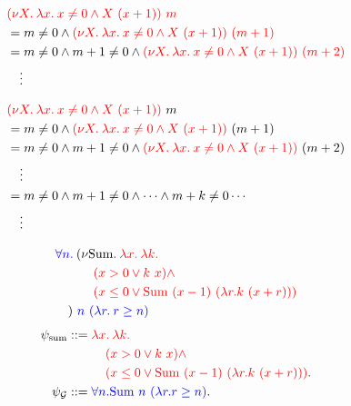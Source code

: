 \documentclass{jarticle}
\theoremstyle{definition}
\newcommand \goal {\psi}
\newcommand {\pdrtop} {\psi_{\mathcal{G}}}
\begin{document}
\begin{align*}
&{ \color{red} (\nu X.\: \lambda x.\: x \neq 0 \wedge X\ (x + 1)) \ m} \\
  &= m \neq 0 \wedge { \color{red} (\nu X.\: \lambda x.\: x \neq 0 \wedge X\
          (x + 1))\ (m + 1)}
    \\
  &= m \neq 0 \wedge m +1 \neq 0 \wedge {\color{red}(\nu X.\: \lambda x.\: x \neq 0 \wedge
          X\ (x + 1))\ (m + 2)} \\
  &\quad \vdots \\
\end{align*}

\begin{align*}
    &{\color{red} (\nu X.\: \lambda x.\: x \neq 0 \wedge X\ (x + 1))}\ m \\
    &= m \neq 0 \wedge {\color{red} (\nu X.\: \lambda x.\: x \neq 0 \wedge X\ (x
    + 1))}\ (m + 1)
    \\
    &= m \neq 0 \wedge m +1 \neq 0 \wedge {\color{red} (\nu X.\: \lambda x.\: x
    \neq 0 \wedge
          X\ (x + 1))}\ (m + 2) \\
  &\quad \vdots \\
  &= m \neq 0 \wedge m +1 \neq 0 \wedge \dots \wedge m + k \neq 0 \cdots \\
  &\quad \vdots \\
\end{align*}

\begin{align*}
    &{\color{blue}\forall n.\:} (\nu \text{Sum}.\: {\color{red} \lambda x.\:
    \lambda k.\: } \\
                     &\quad\quad\quad {\color{red}(x > 0 \lor k\ x) \land} \\
                     &\quad\quad\quad  {\color{red}(x \leq 0 \lor \text{Sum}\ (x - 1)\ (\lambda
                     r. k\ (x + r)))}\\
    &\quad )\ {\color{blue}n\ (\lambda r.\: r \geq n)}
\end{align*}
\begin{align*}
    \goal_{\text{sum}} &::= {\color{red}\lambda x.\: \lambda k.\:} \\
    &\quad\quad\quad{\color{red}(x > 0 \lor k\ x) \land} \\
                     &\quad\quad\quad  {\color{red} (x \leq 0 \lor \text{Sum}\ (x - 1)\ (\lambda
                     r. k\ (x + r)))}.\\
    \pdrtop &::= {\color{blue}\forall n. \text{Sum}\ n\ (\lambda r. r \geq n)}.
\end{align*}
\end{document}
